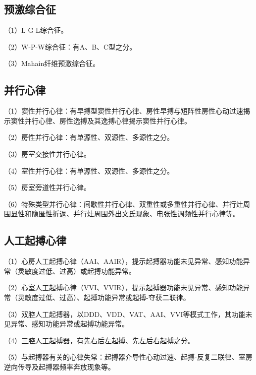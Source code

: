 \protect\hypertarget{text00057.htmlux5cux23subid699}{}{}

\subsection{预激综合征}

（1）L-G-L综合征。

（2）W-P-W综合征：有A、B、C型之分。

（3）Mahain纤维预激综合征。

\protect\hypertarget{text00057.htmlux5cux23subid700}{}{}

\subsection{并行心律}

（1）窦性并行心律：有早搏型窦性并行心律、房性早搏与短阵性房性心动过速揭示窦性并行心律、房性逸搏及其逸搏心律揭示窦性并行心律。

（2）房性并行心律：有单源性、双源性、多源性之分。

（3）房室交接性并行心律。

（4）室性并行心律：有单源性、双源性、多源性之分。

（5）房室旁道性并行心律。

（6）特殊类型并行心律：间歇性并行心律、双重性或多重性并行心律、并行灶周围显性和隐匿性折返、并行灶周围外出文氏现象、电张性调频性并行心律等。

\protect\hypertarget{text00057.htmlux5cux23subid701}{}{}

\subsection{人工起搏心律}

（1）心房人工起搏心律（AAI、AAIR），提示起搏器功能未见异常、感知功能异常（灵敏度过低、过高）或起搏功能异常。

（2）心室人工起搏心律（VVI、VVIR），提示起搏器功能未见异常、感知功能异常（灵敏度过低、过高）、起搏功能异常或起搏-夺获二联律。

（3）双腔人工起搏器，以DDD、VDD、VAT、AAI、VVI等模式工作，其功能未见异常、感知功能异常或起搏功能异常。

（4）三腔人工起搏器，有先右后左起搏、先左后右起搏之分。

（5）与起搏器有关的心律失常：起搏器介导性心动过速、起搏-反复二联律、室房逆向传导及起搏器频率奔放现象等。

\protect\hypertarget{text00057.htmlux5cux23subid702}{}{}

